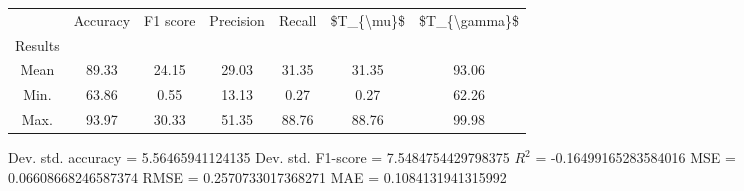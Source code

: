 \begin{tabular}{|c|c|c|c|c|c|c|}
\toprule
{} &  Accuracy &  F1 score &  Precision &  Recall &  \$T\_\{\textbackslash mu\}\$ &  \$T\_\{\textbackslash gamma\}\$ \\
Results &           &           &            &         &            &               \\
\hline
Mean    &     89.33 &     24.15 &      29.03 &   31.35 &      31.35 &         93.06 \\
Min.    &     63.86 &      0.55 &      13.13 &    0.27 &       0.27 &         62.26 \\
Max.    &     93.97 &     30.33 &      51.35 &   88.76 &      88.76 &         99.98 \\
\bottomrule
\end{tabular}

 Dev. std. accuracy = 5.56465941124135
 Dev. std. F1-score = 7.5484754429798375
 $R^2$ = -0.16499165283584016
 MSE = 0.06608668246587374
 RMSE = 0.2570733017368271
 MAE = 0.1084131941315992